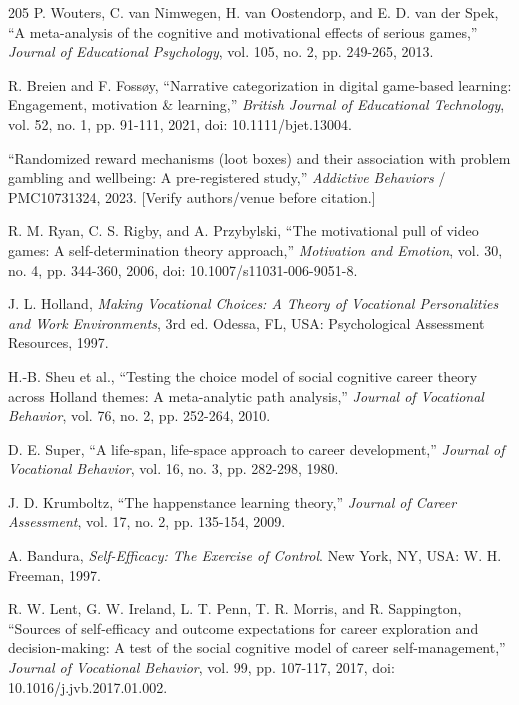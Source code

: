 \begin{thebibliography}{205}
 P. Wouters, C. van Nimwegen, H. van Oostendorp, and E. D. van der Spek, ``A meta-\allowbreak{}analysis of the cognitive and motivational effects of serious games,'' \textit{Journal of Educational Psychology}, vol. 105, no. 2, pp. 249-265, 2013.

 R. Breien and F. Foss\o{}y, ``Narrative categorization in digital game-based learning: Engagement, motivation \& learning,'' \textit{British Journal of Educational Technology}, vol. 52, no. 1, pp. 91-111, 2021, doi: 10.\allowbreak{}1111/\allowbreak{}bjet.\allowbreak{}13004.

 ``Randomized reward mechanisms (loot boxes) and their association with problem gambling and wellbeing: A pre-\allowbreak{}registered study,'' \textit{Addictive Behaviors} / PMC10731324, 2023. [Verify authors/\allowbreak{}venue before citation.]

 R. M. Ryan, C. S. Rigby, and A. Przybylski, ``The motivational pull of video games: A self-\allowbreak{}determination theory approach,'' \textit{Motivation and Emotion}, vol. 30, no. 4, pp. 344-360, 2006, doi: 10.\allowbreak{}1007/\allowbreak{}s11031-\allowbreak{}006-\allowbreak{}9051-\allowbreak{}8.

 J. L. Holland, \textit{Making Vocational Choices: A Theory of Vocational Personalities and Work Environments}, 3rd ed. Odessa, FL, USA: Psychological Assessment Resources, 1997.

 H.-B. Sheu et al., ``Testing the choice model of social cognitive career theory across Holland themes: A meta-\allowbreak{}analytic path analysis,'' \textit{Journal of Vocational Behavior}, vol. 76, no. 2, pp. 252-264, 2010.

 D. E. Super, ``A life-span, life-space approach to career development,'' \textit{Journal of Vocational Behavior}, vol. 16, no. 3, pp. 282-298, 1980.

 J. D. Krumboltz, ``The happenstance learning theory,'' \textit{Journal of Career Assessment}, vol. 17, no. 2, pp. 135-154, 2009.

 A. Bandura, \textit{Self-\allowbreak{}Efficacy: The Exercise of Control}. New York, NY, USA: W. H. Freeman, 1997.

 R. W. Lent, G. W. Ireland, L. T. Penn, T. R. Morris, and R. Sappington, ``Sources of self-\allowbreak{}efficacy and outcome expectations for career exploration and decision-\allowbreak{}making: A test of the social cognitive model of career self-\allowbreak{}management,'' \textit{Journal of Vocational Behavior}, vol. 99, pp. 107-117, 2017, doi: 10.\allowbreak{}1016/\allowbreak{}j.\allowbreak{}jvb.\allowbreak{}2017.\allowbreak{}01.\allowbreak{}002.


\end{thebibliography}
